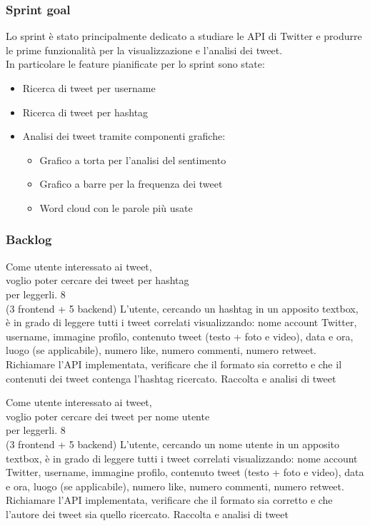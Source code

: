 \subsubsection{Sprint goal}
Lo sprint è stato principalmente dedicato a studiare le API di Twitter e produrre le prime funzionalità per la visualizzazione e l'analisi dei tweet.\\
In particolare le feature pianificate per lo sprint sono state:
\begin{itemize}
    \item Ricerca di tweet per username
    \item Ricerca di tweet per hashtag
    \item Analisi dei tweet tramite componenti grafiche:
    \begin{itemize}
        \item Grafico a torta per l'analisi del sentimento
        \item Grafico a barre per la frequenza dei tweet
        \item Word cloud con le parole più usate
    \end{itemize}
\end{itemize}


\subsubsection{Backlog}
\userstory%
{Come utente interessato ai tweet,\\voglio poter cercare dei tweet per hashtag\\per leggerli.}%
{8\\(3 frontend + 5 backend)}%
{L'utente, cercando un hashtag in un apposito textbox, è in grado di leggere tutti i tweet correlati visualizzando:
nome account Twitter, username, immagine profilo, contenuto tweet (testo + foto e video), data e ora, luogo (se applicabile), numero like, numero commenti, numero retweet.}%
{Richiamare l'API implementata, verificare che il formato sia corretto e che il contenuti dei tweet contenga l'hashtag ricercato.}
{Raccolta e analisi di tweet}

\userstory%
{Come utente interessato ai tweet,\\voglio poter cercare dei tweet per nome utente\\per leggerli.}%
{8\\(3 frontend + 5 backend)}%
{L'utente, cercando un nome utente in un apposito textbox, è in grado di leggere tutti i tweet correlati visualizzando:
nome account Twitter, username, immagine profilo, contenuto tweet (testo + foto e video), data e ora, luogo (se applicabile), numero like, numero commenti, numero retweet.}%
{Richiamare l'API implementata, verificare che il formato sia corretto e che l'autore dei tweet sia quello ricercato.}
{Raccolta e analisi di tweet}

